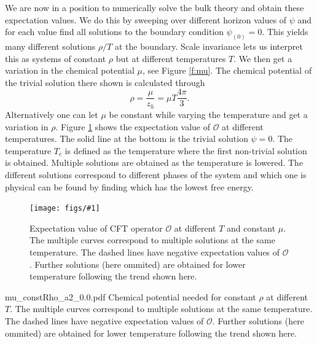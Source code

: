 \documentclass[12pt]{report}
\newcommand{\fig}[3]{
\begin{figure}
\centering
\texttt{[image: figs/\#1]}
\caption{#2}
\end{figure}
}
\begin{document}
We are now in a position to numerically solve the bulk theory and obtain these expectation values. We do this by sweeping over different horizon values of $\psi$ and for each value find all solutions to the boundary condition $\psi_{(0)}=0$. This yields many different solutions $\rho/T$ at the boundary. Scale invariance lets us interpret this as systems of constant $\rho$ but at different temperatures $T$. We then get a variation in the chemical potential $\mu$, see Figure \ref{f:mu}. The chemical potential of the trivial solution there shown is calculated through
\begin{equation}
 \rho=\frac{\mu}{z_h}=\mu T\frac{4\pi}{3}.\label{muTdep}
\end{equation}
Alternatively one can let $\mu$ be constant while varying the temperature and get a variation in $\rho$. Figure \ref{f:O} shows the expectation value of $\mathcal{O}$ at different temperatures. The solid line at the bottom is the trivial solution $\psi=0$. The temperature $T_c$ is defined as the temperature where the first non-trivial solution is obtained. Multiple solutions are obtained as the temperature is lowered. The different solutions correspond to different phases of the system and which one is physical can be found by finding which has the lowest free energy.

\fig{O_constRho_a2_0.0.pdf}{Expectation value of CFT operator $\mathcal{O}$ at different $T$ and constant $\mu$. The multiple curves correspond to multiple solutions at the same temperature. The dashed lines have negative expectation values of $\mathcal{O}$. Further solutions (here ommited) are obtained for lower temperature following the trend shown here.\label{f:O}}

\fig{mu_constRho_a2_0.0.pdf}{
Chemical potential needed for constant $\rho$ at different $T$. The multiple curves correspond to multiple solutions at the same temperature. The dashed lines have negative expectation values of $\mathcal{O}$. Further solutions (here ommited) are obtained for lower temperature following the trend shown here.\label{f:mu}
}
\end{document}
